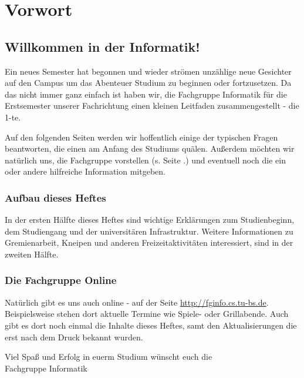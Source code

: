 
\section{Vorwort}
\label{vorwort}
	\begin{multicols}{2}
	\subsection*{Willkommen in der Informatik!}	

	Ein neues Semester hat begonnen und wieder strömen unzählige neue Gesichter auf den Campus um das Abenteuer Studium zu beginnen oder fortzusetzen. Da das nicht immer ganz einfach ist haben wir, die Fachgruppe Informatik für die Erstsemester unserer Fachrichtung einen kleinen Leitfaden zusammengestellt - die 1-te.

	Auf den folgenden Seiten werden wir hoffentlich einige der typischen Fragen beantworten, die einen am Anfang des Studiums quälen. Außerdem möchten wir natürlich uns, die Fachgruppe vorstellen (s. Seite .\pageref{fachgruppe}) und eventuell noch die ein oder andere hilfreiche Information mitgeben. 

	\subsubsection*{Aufbau dieses Heftes}
		In der ersten Hälfte dieses Heftes sind wichtige Erklärungen zum Studienbeginn, dem Studiengang und der universitären Infrastruktur. Weitere Informationen zu Gremienarbeit, Kneipen und anderen Freizeitaktivitäten interessiert, sind in der zweiten Hälfte.
	\subsubsection*{Die Fachgruppe Online}
		Natürlich gibt es uns auch online - auf der Seite \url{http://fginfo.cs.tu-bs.de}. Beispielsweise stehen dort aktuelle Termine wie Spiele- oder Grillabende. Auch gibt es dort noch einmal die Inhalte dieses Heftes, samt den Aktualisierungen die erst nach dem Druck bekannt wurden. 

	\vspace*{0.5cm}

	Viel Spaß und Erfolg in euerm Studium wünscht euch die\\
	\hspace*{2cm}Fachgruppe Informatik
	\end{multicols}